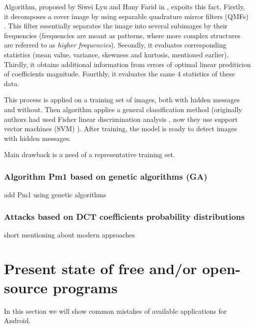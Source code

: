 Algorithm, proposed by Siwei Lyu and Hany Farid in \cite{lyu2002detecting}, expoits this fact.
Firstly, it decomposes a cover image by using separable quadrature mirror filters (QMFs) \cite{vaidyanathan1987quadrature}.
This filter essentially separates the image into several subimages by their frequencies (frequencies are meant as patterns,
where more complex structures are referred to as \emph{higher frequencies}).
Secondly, it evaluates corresponding statistics (mean value, variance, skewness and kurtosis, mentioned earlier).
Thirdly, it obtains additional information from errors of optimal linear prediticion of coefficients magnitude.
Fourthly, it evaluates the same 4 statistics of these data.

This process is applied on a training set of images, both with hidden messages and without. Then algorithm
applies a general classification method (originally authors had used Fisher linear discrimination analysis \cite{welling2005fisher}, now
they use support vector machines (SVM) \cite{vapnik2013nature}). After training, the model is ready to detect images with hidden messages.

Main drawback is a need of a representative training set. 

\subsubsection{Algorithm Pm1 based on genetic algorithms (GA)}


\TODO add Pm1 using genetic algorithms

\subsubsection{Attacks based on DCT coefficients probability distributions}
\TODO short mentioning about modern approaches

\section{Present state of free and/or open-source programs}
In this section we will show common mistakes of available applications for Android.

